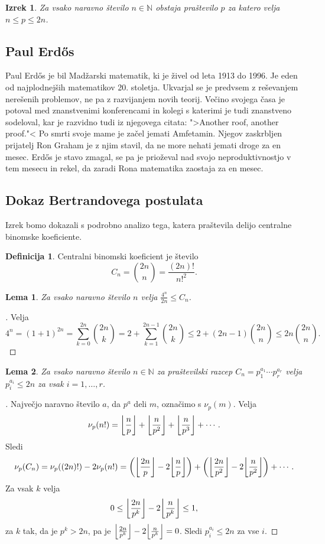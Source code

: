 \documentclass[a4paper,12pt]{article}
\def\N{\mathbb{N}}
\theoremstyle{definition}
\newtheorem{definicija}{Definicija}
\theoremstyle{plain}
\newtheorem{izrek}{Izrek}
\newtheorem{lema}{Lema}
\newenvironment{dokaz}{\begin{proof}[\bfseries\upshape\proofname]}{\end{proof}}
\DeclarePairedDelimiter\floor{\lfloor}{\rfloor}
\begin{document}
\begin{izrek}
    Za vsako naravno število $n \in \N$ obstaja praštevilo $p$ za katero velja $n \leq p \leq 2n$.
\end{izrek}


\subsection{Paul Erd\H{o}s}
Paul Erd\H{o}s je bil Madžarski matematik, ki je živel od leta 1913 do 1996. Je eden od najplodnejših matematikov 20. stoletja. Ukvarjal se je predvsem z reševanjem nerešenih problemov, ne pa z razvijanjem novih teorij. Večino svojega časa je potoval med znanstvenimi konferencami in kolegi s katerimi je tudi znanstveno sodeloval, kar je razvidno tudi iz njegovega citata: ">Another roof, another proof."< Po smrti svoje mame je začel jemati Amfetamin. Njegov zaskrbljen prijatelj Ron Graham je z njim stavil, da ne more nehati jemati droge za en mesec. Erd\H{o}s je stavo zmagal, se pa je prioževal nad svojo neproduktivnostjo v tem mesecu in rekel, da zaradi Rona matematika zaostaja za en mesec.


\subsection{Dokaz Bertrandovega postulata}
Izrek bomo dokazali s podrobno analizo tega, katera praštevila delijo centralne binomske koeficiente.

\begin{definicija} %
    Centralni binomski koeficient je število $$C_n = \binom{2n}{n} = \frac{(2n)!}{n!^2}.$$
\end{definicija}

\begin{lema}
    \label{lema1}
    Za vsako naravno število $n$ velja $\frac{4^n}{2n} \leq C_n$.
\end{lema}
\begin{dokaz} %
    Velja $$4^n = (1+1)^{2n} = \sum_{k = 0}^{2n} \binom{2n}{k} = 2 + \sum_{k = 1}^{2n - 1} \binom{2n}{k} \leq 2 + (2n - 1)\binom{2n}{n} \leq 2n\binom{2n}{n}.$$
\end{dokaz}

\begin{lema}
    \label{lema2}
    Za vsako naravno število $n \in \N$ za praštevilski razcep $C_n = p_1^{a_1} \cdots p_r^{a_r}$ velja $p_i^{a_i} \leq 2n$ za vsak $i = 1,\ldots,r$. 
\end{lema}
\begin{dokaz}
    Največjo naravno število $a$, da $p^a$ deli $m$, označimo s $\nu_p(m)$. Velja $$\nu_p(n!) = \floor*{\frac{n}{p}} + \floor*{\frac{n}{p^2}} + \floor*{\frac{n}{p^3}} + \cdots.$$ Sledi $$\nu_p(C_n) = \nu_p((2n)!) - 2\nu_p(n!) = \left( \floor*{\frac{2n}{p}} - 2\floor*{\frac{n}{p}} \right) + \left( \floor*{\frac{2n}{p^2}} - 2\floor*{\frac{n}{p^2}} \right) + \cdots.$$ Za vsak $k$ velja $$0 \leq \floor*{\frac{2n}{p^k}} - 2\floor*{\frac{n}{p^k}} \leq 1,$$ za $k$ tak, da je $p^k > 2n$, pa je $\floor*{\frac{2n}{p^k}} - 2\floor*{\frac{n}{p^k}} = 0$. Sledi $p_i^{a_i} \leq 2n$ za vse $i$.
\end{dokaz}
\end{document}
